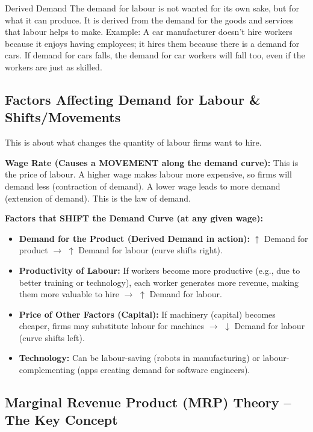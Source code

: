 \documentclass[11pt, a4paper, twoside]{book}
\begin{document}
\begin{keyterm}{Derived Demand}
The demand for labour is not wanted for its own sake, but for what it can produce. It is derived from the demand for the goods and services that labour helps to make. Example: A car manufacturer doesn't hire workers because it enjoys having employees; it hires them because there is a demand for cars. If demand for cars falls, the demand for car workers will fall too, even if the workers are just as skilled.
\end{keyterm}

\subsection{Factors Affecting Demand for Labour \& Shifts/Movements}

This is about what changes the quantity of labour firms want to hire.

\textbf{Wage Rate (Causes a MOVEMENT along the demand curve):} This is the price of labour. A higher wage makes labour more expensive, so firms will demand less (contraction of demand). A lower wage leads to more demand (extension of demand). This is the law of demand.

\textbf{Factors that SHIFT the Demand Curve (at any given wage):}
\begin{itemize}
  \item \textbf{Demand for the Product (Derived Demand in action):} $\uparrow$ Demand for product $\rightarrow$ $\uparrow$ Demand for labour (curve shifts right).
  \item \textbf{Productivity of Labour:} If workers become more productive (e.g., due to better training or technology), each worker generates more revenue, making them more valuable to hire $\rightarrow$ $\uparrow$ Demand for labour.
  \item \textbf{Price of Other Factors (Capital):} If machinery (capital) becomes cheaper, firms may substitute labour for machines $\rightarrow$ $\downarrow$ Demand for labour (curve shifts left).
  \item \textbf{Technology:} Can be labour-saving (robots in manufacturing) or labour-complementing (apps creating demand for software engineers).
\end{itemize}

\subsection{Marginal Revenue Product (MRP) Theory -- The Key Concept}
\end{document}
